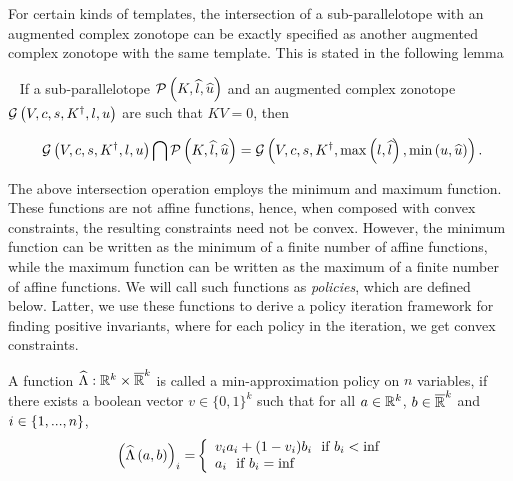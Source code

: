 For certain kinds of templates, the intersection of a
sub-parallelotope with an augmented complex zonotope can be exactly
specified as another augmented complex zonotope with the same
template.  This is stated in the following lemma 
\begin{lemma}~\label{lem:intersection} If a sub-parallelotope
  $\mathcal{P}\left(K,\widehat{l},\widehat{u}\right)$ and an augmented complex zonotope
  $\mathcal{G}\left(V,c,s,K^\dagger,l,u\right)$ are such that $KV=0$, then
  
\begin{equation}~\label{eqn:intersection}
\mathcal{G}\left(V,c,s,K^\dagger,l,u\right)\bigcap \mathcal{P}\left(K,\widehat{l},\widehat{u}\right) =
  \mathcal{G}\left(V,c,s,K^\dagger,\max\left(l,\widehat{l}\right),\min\left(u,\widehat{u}\right)\right).
\end{equation}
\end{lemma}

The above intersection operation employs the minimum and maximum
function.  These functions are not affine functions, hence, when
composed with convex constraints, the resulting constraints need not
be convex.  However, the minimum function can be written as the
minimum of a finite number of affine functions, while the maximum
function can be written as the maximum of a finite number of affine
functions.  We will call such functions as \emph{policies}, which are
defined below.  Latter, we use these functions to derive a policy
iteration framework for finding positive invariants, where for each
policy in the iteration, we  get convex constraints.

\begin{definition} A function
  $\widehat{\Lambda}:\mathbb{R}^k\times\mathbb{\overline{R}}^k$ is called a
  min-approximation policy on $n$ variables, if there exists a boolean
  vector $v\in\{0,1\}^k$ such that for all $a\in\mathbb{R}^k$,
  $b\in\mathbb{\overline{R}}^k$ and $i\in\{1,...,n\}$,
\begin{align}
\left(\widehat{\Lambda}\left(a,b\right)\right)_i= & \left\{
\begin{array}{l}
v_ia_i+(1-v_i)b_i~~\text{if}~b_i<\inf\\
a_i~~\text{if}~b_i=\inf
\end{array}
\right.
\end{align}
\end{definition}
%


